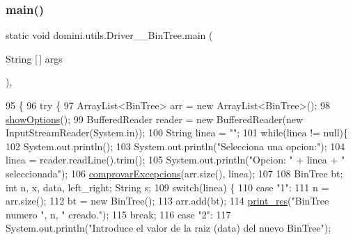 \subsubsection{\texorpdfstring{main()}{main()}}
{\footnotesize\ttfamily static void domini.\+utils.\+Driver\+\_\+\+\_\+\+Bin\+Tree.\+main (\begin{DoxyParamCaption}\item[{String \mbox{[}$\,$\mbox{]}}]{args }\end{DoxyParamCaption})\hspace{0.3cm}{\ttfamily [inline]}, {\ttfamily [static]}}


\begin{DoxyCode}
95                                            \{
96         \textcolor{keywordflow}{try} \{
97             ArrayList<BinTree> arr = \textcolor{keyword}{new} ArrayList<BinTree>();
98             \hyperlink{classdomini_1_1utils_1_1Driver____BinTree_aadd7535430d353033b6f35b6d466e018}{showOptions}();
99             BufferedReader reader = \textcolor{keyword}{new} BufferedReader(\textcolor{keyword}{new} InputStreamReader(System.in));
100             String linea = \textcolor{stringliteral}{""};
101             \textcolor{keywordflow}{while}(linea != null)\{
102                 System.out.println();
103                 System.out.println(\textcolor{stringliteral}{"Selecciona una opcion:"});
104                 linea = reader.readLine().trim();
105                 System.out.println(\textcolor{stringliteral}{"Opcion: "} + linea + \textcolor{stringliteral}{" seleccionada"});
106                 \hyperlink{classdomini_1_1utils_1_1Driver____BinTree_a06b6edeb965f3677c7ebb085d512f568}{comprovarExcepcions}(arr.size(), linea);
107 
108                 BinTree bt; \textcolor{keywordtype}{int} n, x, data, left\_right; String s;
109                 \textcolor{keywordflow}{switch}(linea) \{
110                     \textcolor{keywordflow}{case} \textcolor{stringliteral}{"1"}:
111                         n = arr.size();
112                         bt = \textcolor{keyword}{new} BinTree();
113                         arr.add(bt);
114                         \hyperlink{classdomini_1_1utils_1_1Driver____BinTree_a434e26afb3eb701558d81b0fd1c29dcb}{print\_res}(\textcolor{stringliteral}{"BinTree numero "}, n, \textcolor{stringliteral}{" creado."});
115                     \textcolor{keywordflow}{break};
116                     \textcolor{keywordflow}{case} \textcolor{stringliteral}{"2"}:
117                         System.out.println(\textcolor{stringliteral}{"Introduce el valor de la raiz (data) del nuevo BinTree"});

\end{DoxyCode}
